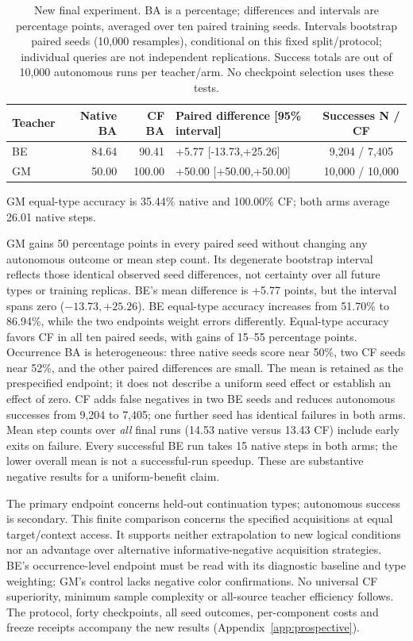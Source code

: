 \begin{table}[htbp]\centering\small
\begin{tabular}{lrrlc}
\toprule Teacher & Native BA & CF BA & Paired difference [95\% interval] & Successes N / CF \\
\midrule
BE & 84.64 & 90.41 & +5.77 [-13.73,+25.26] & 9,204 / 7,405 \\
GM & 50.00 & 100.00 & +50.00 [+50.00,+50.00] & 10,000 / 10,000 \\
\bottomrule
\end{tabular}
\caption{New final experiment. BA is a percentage; differences and intervals are percentage points,
averaged over ten paired training seeds. Intervals bootstrap paired seeds
(10,000 resamples), conditional on this fixed split/protocol; individual
queries are not independent replications. Success totals are out of 10,000
autonomous runs per teacher/arm. No checkpoint selection uses these tests.}
\label{tab:prospective}
\end{table}

GM equal-type accuracy is 35.44\% native and 100.00\% CF; both arms average 26.01 native steps.

GM gains 50 percentage points in every paired seed without changing any
autonomous outcome or mean step count. Its degenerate bootstrap interval
reflects those identical observed seed differences, not certainty over all
future types or training replicas. BE's mean difference is +5.77 points, but
the interval spans zero (\(-13.73,+25.26\)). BE equal-type accuracy increases
from 51.70\% to 86.94\%, while the two endpoints weight errors differently.
Equal-type accuracy favors CF in all ten paired seeds, with gains of
15--55 percentage points. Occurrence BA is heterogeneous: three native seeds
score near 50\%, two CF seeds near 52\%, and the other paired differences
are small. The mean is retained as the prespecified endpoint; it does not
describe a uniform seed effect or establish an effect of zero.
CF adds false negatives in two BE seeds and reduces autonomous successes from
9,204 to 7,405; one further seed has identical failures in both arms.
Mean step counts over \emph{all} final runs (14.53 native versus 13.43 CF)
include early exits on failure. Every successful BE run takes 15 native
steps in both arms; the lower overall mean is not a successful-run speedup.
These are substantive negative results for a uniform-benefit claim.




The primary endpoint concerns held-out continuation types; autonomous success
is secondary. This finite comparison concerns the specified acquisitions at
equal target/context access. It supports neither extrapolation to new logical
conditions nor an advantage over alternative informative-negative acquisition
strategies. BE's occurrence-level endpoint must be read with its diagnostic
baseline and type weighting; GM's control lacks negative color confirmations.
No universal CF superiority, minimum sample complexity or all-source teacher
efficiency follows.
The protocol, forty checkpoints, all seed outcomes, per-component costs and
freeze receipts accompany the new results (Appendix~\ref{app:prospective}).
